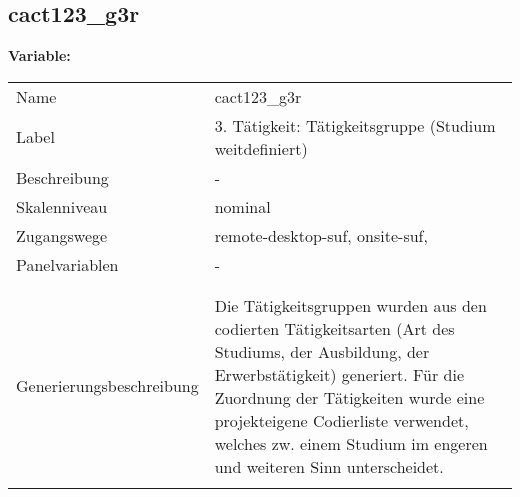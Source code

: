 	
	
	\subsection{cact123\_g3r}
	\label{subSection:cact123_g3r}

	\noindent\textbf{Variable:}\\
		\begin{tabular}{lL{11.3cm}}
			\label{tableVariable:cact123_g3r}
			Name & cact123\_g3r \\
			Label & 3. Tätigkeit: Tätigkeitsgruppe (Studium weitdefiniert) \\
			Beschreibung & - \\
			Skalenniveau & nominal \\
			Zugangswege &
				remote-desktop-suf,
				onsite-suf,
 \\
			Panelvariablen & -
			 \\
			 \\
 \\
					Generierungsbeschreibung & Die Tätigkeitsgruppen wurden aus den codierten Tätigkeitsarten (Art des Studiums, der Ausbildung, der Erwerbstätigkeit) generiert. Für die Zuordnung der Tätigkeiten wurde eine projekteigene Codierliste verwendet, welches zw. einem Studium im engeren und weiteren Sinn unterscheidet.
				 \\	
			 \\
		\end{tabular}






